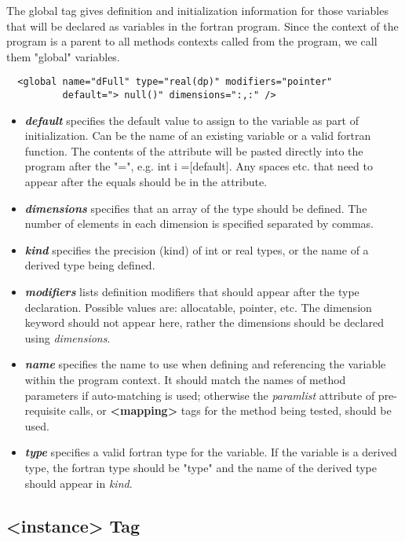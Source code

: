 \documentclass[paper=a4, fontsize=11pt]{scrartcl} %
\numberwithin{equation}{section} %
\numberwithin{figure}{section} %
\numberwithin{table}{section} %
\begin{document}
The global tag gives definition and initialization information for those variables that will be
declared as variables in the fortran program. Since the context of the program is a parent to
all methods contexts called from the program, we call them "global" variables.

\lstset{language=XML}
\begin{lstlisting}
  <global name="dFull" type="real(dp)" modifiers="pointer" 
          default="> null()" dimensions=":,:" />
\end{lstlisting}

\begin{itemize}
\item \textbf{\textit{default}} specifies the default value to assign to the variable as part of 
initialization. Can be the name of an existing variable or a valid fortran function. The contents
of the attribute will be pasted directly into the program after the "=", e.g. int i =[default].
Any spaces etc. that need to appear after the equals should be in the attribute.
\item \textbf{\textit{dimensions}} specifies that an array of the type should be defined. The
number of elements in each dimension is specified separated by commas.
\item \textbf{\textit{kind}} specifies the precision (kind) of int or real types, or the name of a derived
type being defined.
\item \textbf{\textit{modifiers}} lists definition modifiers that should appear after the type declaration.
Possible values are: allocatable, pointer, etc. The dimension keyword should not appear here, rather the
dimensions should be declared using \textit{dimensions}.
\item \textbf{\textit{name}} specifies the name to use when defining and referencing the variable within
the program context. It should match the names of method parameters if auto-matching is used; otherwise
the \textit{paramlist} attribute of pre-requisite calls, or \textbf{<mapping>} tags for the method being
tested, should be used.
\item \textbf{\textit{type}} specifies a valid fortran type for the variable. If the variable is a derived
type, the fortran type should be "type" and the name of the derived type should appear in \textit{kind}.
\end{itemize}

\subsection{<instance> Tag}
\end{document}

